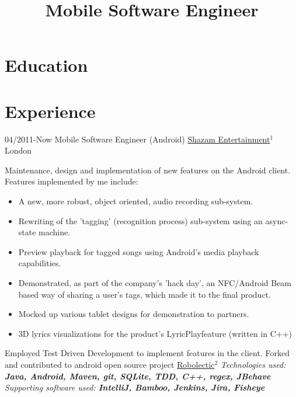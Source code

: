 \documentclass[11pt,a4paper,sans]{moderncv}   %
\title{Mobile Software Engineer}               %
\newcommand{\superscript}[1]{$^{#1}$}
\begin{document}
\makecvtitle

\section{Education}

\section{Experience}
\cventry
  {04/2011-Now}
  {Mobile Software Engineer (Android)}
  {\href{www.shazam.com}{Shazam Entertainment}\superscript{1}}
  {London}
  {}
  { 
    Maintenance, design and implementation of new features on the Android client.\newline{}%
    Features implemented by me include:
    \begin{itemize}%
    \item A new, more robust, object oriented, audio recording sub-system.
    \item Rewriting of the 'tagging' (recognition process) sub-system using an async-state machine. 
    \item Preview playback for tagged songs using Android's media playback capabilities.
    \item Demonstrated, as part of the company's 'hack day', an NFC/Android Beam based way of sharing a user's tags, which made it to the final product.
    \item Mocked up various tablet designs for demonstration to partners.
    \item 3D lyrics visualizations for the product's LyricPlay\texttrademark  feature (written in C++)
    \end{itemize}
    Employed Test Driven Development to implement features in the client.\newline{}%
    Forked and contributed to android open source project \href{https://github.com/shazam/robolectric}{Robolectic}\superscript{2}\newline{}%
    \emph{Technologies used: \textbf{Java, Android, Maven, git, SQLite, TDD, C++, regex, JBehave}}\newline{}%
    \emph{Supporting software used: \textbf{IntelliJ, Bamboo, Jenkins, Jira, Fisheye}}
  }
  
\end{document}

